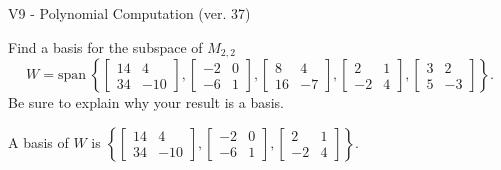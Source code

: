 \begin{exercise}
  \begin{exerciseTitle}V9 - Polynomial Computation (ver. 37)\end{exerciseTitle}
  \begin{exerciseStatement}
    Find a basis for the subspace of \(M_{2,2}\) 
\[W=\mathrm{span}\ \left\{\left[\begin{array}{cc}
14 & 4 \\
34 & -10
\end{array}\right] , \left[\begin{array}{cc}
-2 & 0 \\
-6 & 1
\end{array}\right] , \left[\begin{array}{cc}
8 & 4 \\
16 & -7
\end{array}\right] , \left[\begin{array}{cc}
2 & 1 \\
-2 & 4
\end{array}\right] , \left[\begin{array}{cc}
3 & 2 \\
5 & -3
\end{array}\right]\right\}.\]
 Be sure to explain why your result is a basis.


  \end{exerciseStatement}
  \begin{exerciseAnswer}
   A basis of \(W\) is  \(\left\{\left[\begin{array}{cc}
14 & 4 \\
34 & -10
\end{array}\right] , \left[\begin{array}{cc}
-2 & 0 \\
-6 & 1
\end{array}\right] , \left[\begin{array}{cc}
2 & 1 \\
-2 & 4
\end{array}\right]\right\}\).
  


  \end{exerciseAnswer}
\end{exercise}